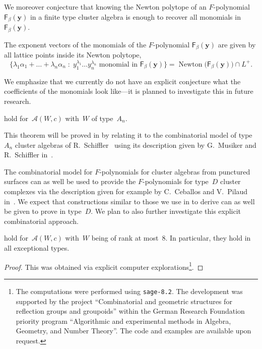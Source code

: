 \documentclass[ALCO,Unicode,ThmDefs]{cedram}
\newcommand{\y}{\mathbf{y}}
\newcommand{\Alg}{\mathcal{A}}
\newcommand{\Fpoly}[2]{{\mathsf{F}_{#1}(#2)}}
\newcommand{\Newton}[1]{{\operatorname{Newton}\big(#1 \big)}}
\newcommand{\bigset}[2]{\big\{ #1 \;:\; #2 \big\}}
\begin{document}
We moreover conjecture that knowing the Newton polytope of an $F$-polynomial $\Fpoly{\beta}{\y}$ in a finite type cluster algebra is enough to recover all monomials in $\Fpoly{\beta}{\y}$.

\begin{conj}\label{conj:latticepoints}
The exponent vectors of the monomials of the $F$-polynomial $\Fpoly{\beta}{\y}$ are given by all lattice points inside its Newton polytope,
\[
\bigset{\lambda_1 \alpha_1+\dots+\lambda_n\alpha_n}{y_1^{\lambda_1}\dots y_n^{\lambda_n}\text{ monomial in }\Fpoly{\beta}{\y}} = \Newton{\Fpoly{\beta}{\y}} \cap L^+.
\]
\end{conj}

We emphasize that we currently do not have an explicit conjecture what the coefficients of the monomials look like---it is planned to investigate this in future research.


\begin{theo}\label{thm:main1}
 hold for~$\Alg(W,c)$ with~$W$ of type~$A_n$.
\end{theo}

This theorem will be proved in  by relating it to the combinatorial model of type~$A_n$ cluster algebras of R.~Schiffler~\cite{S2008} using its description given by G.~Musiker and R.~Schiffler in~\cite{MS2010}.

\begin{rema}
The combinatorial model for $F$-polynomials for cluster algebras from punctured surfaces can as well be used to provide the $F$-polynomials for type~$D$ cluster complexes via the description given for example by C.~Ceballos and V.~Pilaud in~\cite{CP2015}. We expect that constructions similar to those we use in  to derive  can as well be given to prove  in type~$D$. We plan to also further investigate this explicit combinatorial approach.
\end{rema}

\begin{theo}\label{thm:main2}
 hold for~$\Alg(W,c)$ with~$W$ being of rank at most~$8$. In particular, they hold in all exceptional types.
\end{theo}

\begin{proof}
This was obtained via explicit computer explorations\footnote{The computations were performed using \texttt{sage-8.2}. The development was supported by the project ``Combinatorial and geometric structures for reflection groups and groupoids'' within the German Research Foundation priority program ``Algorithmic and experimental methods in Algebra, Geometry, and Number Theory''. The code and examples are available upon request.}.
\end{proof}
\end{document}
